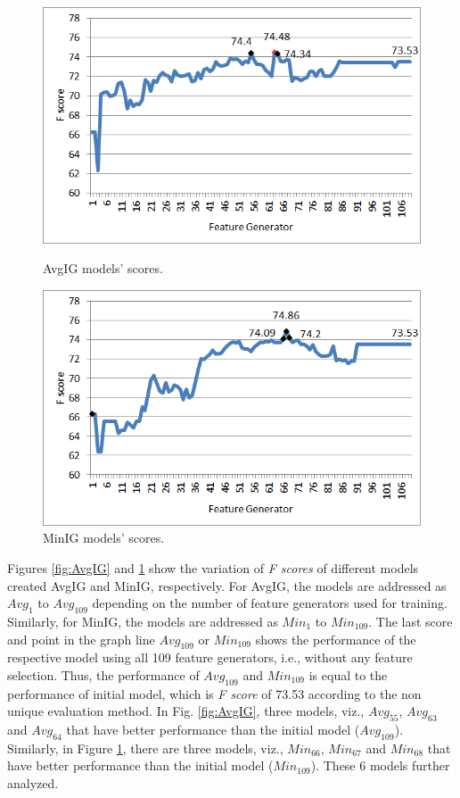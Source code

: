 \begin{figure}
\centering
\begin{minipage}{.5\textwidth}
  \centering
  \includegraphics[width=.95\textwidth]{figures/AvgIGAnalysis.png}
  \caption{AvgIG models' scores.}
  \label{fig:AvgIG}
\end{minipage}%
\begin{minipage}{.5\textwidth}
  \centering
  \includegraphics[width=.95\textwidth]{figures/MinIGAnalysis.png}
  \caption{MinIG models' scores.}
  \label{fig:MinIG}
\end{minipage}
\end{figure}

Figures \ref{fig:AvgIG} and \ref{fig:MinIG} show the variation of \textit{F scores} of different models created AvgIG and MinIG, respectively. For AvgIG, the models are addressed as $Avg_1$ to $Avg_{109}$ depending on the number of feature generators used for training. Similarly, for MinIG, the models are addressed as $Min_{1}$ to $Min_{109}$. The last score and point in the graph line $Avg_{109}$ or $Min_{109}$ shows the performance of the respective model using all 109 feature generators, i.e., without any feature selection. Thus, the performance of $Avg_{109}$ and $Min_{109}$ is equal to the performance of initial model, which is \textit{F score} of 73.53 according to the non unique evaluation method. In Fig. \ref{fig:AvgIG}, three models, viz., $Avg_{55}$, $Avg_{63}$ and $Avg_{64}$ that have better performance than the initial model ($Avg_{109}$). Similarly, in Figure \ref{fig:MinIG}, there are three models, viz., $Min_{66}$, $Min_{67}$ and $Min_{68}$ that have better performance than the initial model ($Min_{109}$). These 6 models further analyzed.

